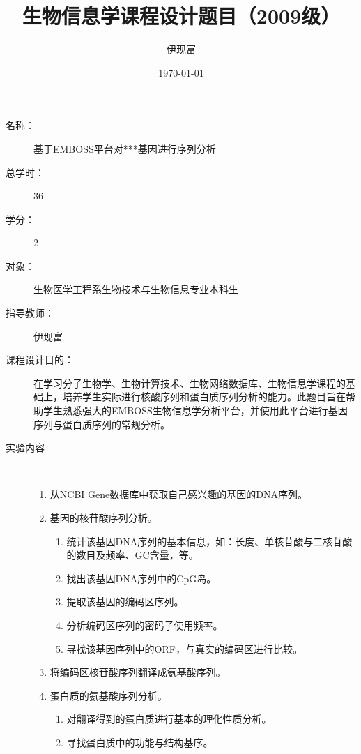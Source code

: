 



\title{生物信息学课程设计题目（2009级）}
\author{伊现富}
\date{\today}
\maketitle


\begin{description}
	\item[名称：] 基于EMBOSS平台对***基因进行序列分析
	\item[总学时：] 36
	\item[学分：] 2
	\item[对象：] 生物医学工程系生物技术与生物信息专业本科生
	\item[指导教师：] 伊现富
	\item[课程设计目的：] 在学习分子生物学、生物计算技术、生物网络数据库、生物信息学课程的基础上，培养学生实际进行核酸序列和蛋白质序列分析的能力。此题目旨在帮助学生熟悉强大的EMBOSS生物信息学分析平台，并使用此平台进行基因序列与蛋白质序列的常规分析。
	\item[实验内容] \
		\begin{enumerate}
			\item 从NCBI Gene数据库中获取自己感兴趣的基因的DNA序列。
			\item 基因的核苷酸序列分析。
				\begin{enumerate}
					\item 统计该基因DNA序列的基本信息，如：长度、单核苷酸与二核苷酸的数目及频率、GC含量，等。
					\item 找出该基因DNA序列中的CpG岛。
					\item 提取该基因的编码区序列。
					\item 分析编码区序列的密码子使用频率。
					\item 寻找该基因序列中的ORF，与真实的编码区进行比较。
				\end{enumerate}
			\item 将编码区核苷酸序列翻译成氨基酸序列。
			\item 蛋白质的氨基酸序列分析。
				\begin{enumerate}
					\item 对翻译得到的蛋白质进行基本的理化性质分析。
					\item 寻找蛋白质中的功能与结构基序。

\end{enumerate}
\end{enumerate}
\end{description}
